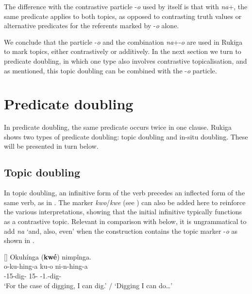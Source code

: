 \documentclass[output=paper]{langscibook}
\begin{document}
\z
\z

The difference with the contrastive particle -\textit{o} used by itself is that with \textit{na}+\PRO{}, the same predicate applies to both topics, as opposed to contrasting truth values or alternative predicates for the referents marked by -\textit{o} alone.

We conclude that the particle -\textit{o} and the combination \textit{na}+-\textit{o} are used in Rukiga to mark topics, either contrastively or additively. In the next section we turn to predicate doubling, in which one type also involves contrastive topicalisation, and as mentioned, this topic doubling can be combined with the -\textit{o} particle.\pagebreak

\section{Predicate doubling}\label{sec:preddoubling}

In predicate doubling, the same predicate occurs twice in one clause. Rukiga shows two types of predicate doubling: topic doubling and in-situ doubling. These will be presented in turn below. 

\subsection{Topic doubling}

In topic doubling, an infinitive form of the verb precedes an inflected form of the same verb, as in . The marker \textit{kwo}/\textit{kwe} (see ) can also be added here to reinforce the various interpretations, showing that the initial infinitive typically functions as a contrastive topic. Relevant in comparison with  below, it is ungrammatical to add \textit{na} ‘and, also, even’ when the construction contains the topic marker -\textit{o} as shown in .

\ea
\label{bkm:Ref98832788}
\ea
[]{
\label{bkm:Ref98832788:a}
Okuhínga (\textbf{kwé}) nimpînga.\\
\gll
o-ku-hing-a  ku-o  ni-n-hing-a\\
\AUG{}-{}15-dig-\FV{}  15-\CM{}  \IPFV{}-1\SG{}.\SM{}-{}dig-\FV{}\\
\glt
‘For the case of digging, I can dig.’ / ‘Digging I can do…’\\
}
\end{document}
